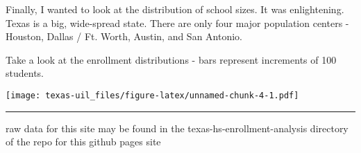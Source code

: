 \documentclass[]{book}
\begin{document}
Finally, I wanted to look at the distribution of school sizes. It was
enlightening. Texas is a big, wide-spread state. There are only four
major population centers - Houston, Dallas / Ft. Worth, Austin, and San
Antonio.

Take a look at the enrollment distributions - bars represent increments
of 100 students.

\texttt{[image: texas-uil\_files/figure-latex/unnamed-chunk-4-1.pdf]}

\begin{center}\rule{0.5\linewidth}{\linethickness}\end{center}

raw data for this site may be found in the texas-hs-enrollment-analysis
directory of the repo for this github pages site


\end{document}
